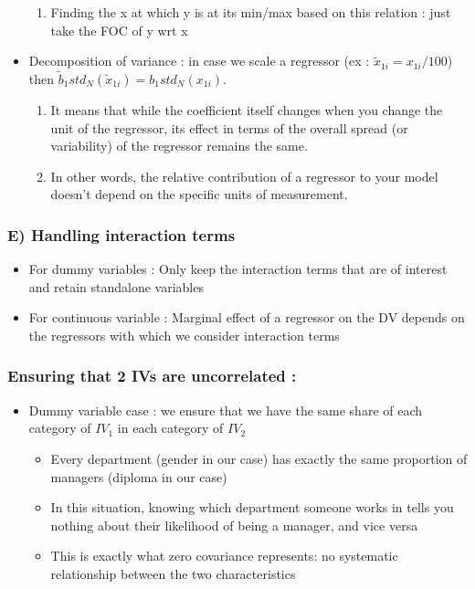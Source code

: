 \documentclass{article}
\begin{document}
\begin{itemize}
\begin{enumerate}
        \item Finding the x at which y is at its min/max based on this relation : just take the FOC of y wrt x
    \end{enumerate}
    \item Decomposition of variance : in case we scale a regressor (ex : $\tilde{x}_{1i} = x_{1i}/100$) then $\tilde{b}_1std_N(\tilde{x}_{1i}) = b_1std_N(x_{1i})$.
    \begin{enumerate}
        \item It means that while the coefficient itself changes when you change the unit of the regressor, its effect in terms of the overall spread (or variability) of the regressor remains the same.
        \item In other words, the relative contribution of a regressor to your model doesn’t depend on the specific units of measurement. 
    \end{enumerate}
\end{itemize}

\subsubsection{E) Handling interaction terms}
\begin{itemize}
    \item For dummy variables : Only keep the interaction terms that are of interest and retain standalone variables
    \item For continuous variable : Marginal effect of a regressor on the DV depends on the regressors with which we consider interaction terms
\end{itemize}

\subsubsection{Ensuring that 2 IVs are uncorrelated :}
\begin{itemize}
    \item Dummy variable case : we ensure that we have the same share of each category of $IV_1$ in each category of $IV_2$
    \begin{infobox}
        \begin{itemize}
            \item Every department (gender in our case) has exactly the same proportion of managers (diploma in our case)
            \item In this situation, knowing which department someone works in tells you nothing about their likelihood of being a manager, and vice versa
            \item This is exactly what zero covariance represents: no systematic relationship between the two characteristics
        \end{itemize}
    \end{infobox}
\end{itemize}
\end{document}
